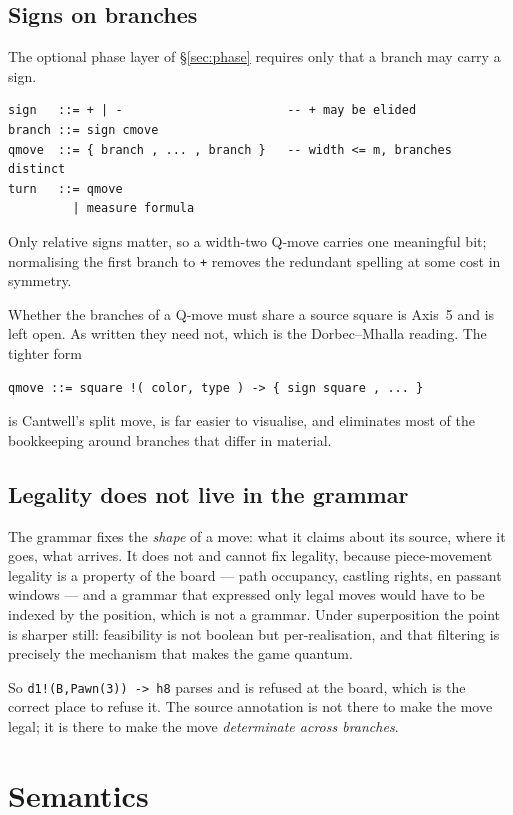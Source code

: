 \documentclass[11pt,a4paper]{article}
\theoremstyle{definition}
\theoremstyle{plain}
\begin{document}
\subsection{Signs on branches}

The optional phase layer of \S\ref{sec:phase} requires only that a branch may
carry a sign.

\begin{lstlisting}
sign   ::= + | -                       -- + may be elided
branch ::= sign cmove
qmove  ::= { branch , ... , branch }   -- width <= m, branches distinct
turn   ::= qmove
         | measure formula
\end{lstlisting}

Only relative signs matter, so a width-two Q-move carries one meaningful bit;
normalising the first branch to \texttt{+} removes the redundant spelling at
some cost in symmetry.

Whether the branches of a Q-move must share a source square is Axis~5 and is
left open. As written they need not, which is the Dorbec--Mhalla reading. The
tighter form
\begin{lstlisting}
qmove ::= square !( color, type ) -> { sign square , ... }
\end{lstlisting}
is Cantwell's split move, is far easier to visualise, and eliminates most of
the bookkeeping around branches that differ in material.

\subsection{Legality does not live in the grammar}

The grammar fixes the \emph{shape} of a move: what it claims about its source,
where it goes, what arrives. It does not and cannot fix legality, because
piece-movement legality is a property of the board --- path occupancy,
castling rights, en passant windows --- and a grammar that expressed only legal
moves would have to be indexed by the position, which is not a grammar. Under
superposition the point is sharper still: feasibility is not boolean but
per-realisation, and that filtering is precisely the mechanism that makes the
game quantum.

So \texttt{d1!(B,Pawn(3)) -> h8} parses and is refused at the board, which is
the correct place to refuse it. The source annotation is not there to make the
move legal; it is there to make the move \emph{determinate across branches}.

\section{Semantics}
\label{sec:sem}
\end{document}
